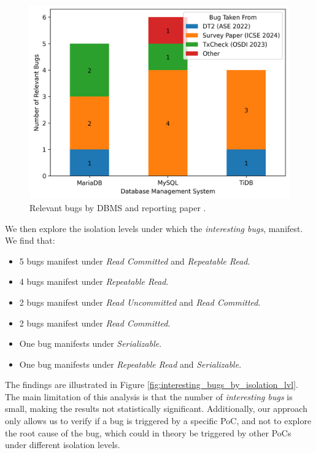\begin{figure}
    \centering
    \includegraphics[width=0.8\linewidth]{assets/bug_replication_interesting_bugs_by_dbms_and_paper.png}
    \caption{Relevant bugs by DBMS and reporting paper  \cite{cui2024understanding_ICSE2024, dou2023detecting_ICSE2023, cui2022differentially_ASE2022}.}
    \label{fig:interesting_bugs_by_paper}
\end{figure}


We then explore the isolation levels under which the \textit{interesting bugs}, manifest. We find that:
\begin{itemize}
\item 5 bugs manifest under \textit{Read Committed} and \textit{Repeatable Read}.
\item 4 bugs manifest under \textit{Repeatable Read}.
\item 2 bugs manifest under \textit{Read Uncommitted} and \textit{Read Committed}.
\item 2 bugs manifest under \textit{Read Committed}.
\item One bug manifests under \textit{Serializable}.
\item One bug manifests under \textit{Repeatable Read} and \textit{Serializable}.
\end{itemize}

The findings are illustrated in Figure \ref{fig:interesting_bugs_by_isolation_lvl}. The main limitation of this analysis is that the number of \textit{interesting bugs} is small, making the results not statistically significant. Additionally, our approach only allows us to verify if a bug is triggered by a specific PoC, and not to explore the root cause of the bug, which could in theory be triggered by other PoCs under different isolation levels.

